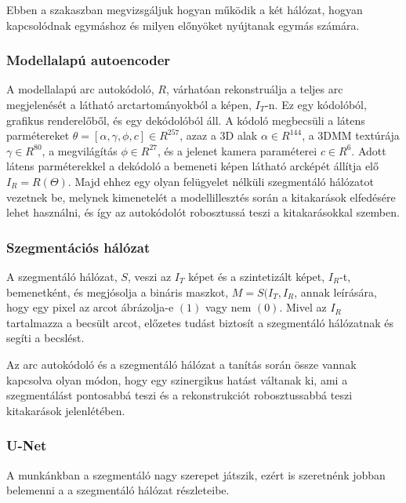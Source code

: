 \documentclass[12pt,a4]{article}
\begin{document}
            Ebben a szakaszban megvizsgáljuk hogyan működik a két hálózat,
     	      hogyan kapcsolódnak egymáshoz és milyen előnyöket nyújtanak
     	      egymás számára.

            \subsubsection{Modellalapú autoencoder}
        
                \cite{focus}A modellalapú arc autokódoló, $R$, várhatóan rekonstruálja a teljes arc
     	          megjelenését a látható arctartományokból a képen, $I_{T}$-n. 
                Ez egy kódolóból, grafikus renderelőből, és egy dekódolóból áll. A kódoló megbecsüli a látens parmétereket $\theta = [\alpha, \gamma, \phi, c] \in R^{257}$, azaz a 3D alak $\alpha \in R^{144}$, a 3DMM textúrája 
                $\gamma ∈ R^{80}$, a megvilágítás $\phi ∈ R^{27}$, és a jelenet kamera paraméterei $c ∈ R^{6}$. Adott látens parméterekkel a dekódoló a bemeneti képen látható arcképét állítja elő $I_{R} = R(\Theta)$. Majd ehhez egy olyan felügyelet nélküli szegmentáló hálózatot vezetnek be, melynek kimenetelét a modellillesztés során a kitakarások elfedésére lehet használni, és így az autokódolót robosztussá teszi a kitakarásokkal szemben.

            \subsubsection{Szegmentációs hálózat}
    
                \cite{focus}A szegmentáló hálózat, $S$, veszi az $I_{T}$ képet és a szintetizált képet, $I_{R}$-t, bemenetként, és megjósolja a bináris maszkot, $M = S(I_{T} , I_{R}$, annak leírására, hogy egy pixel az arcot ábrázolja-e $(1)$ vagy nem $(0)$. Mivel az $I_R$ tartalmazza a becsült arcot, előzetes tudást biztosít a szegmentáló hálózatnak és segíti a becslést.
     	
     	          Az arc autokódoló és a szegmentáló hálózat a tanítás során össze 
                vannak kapcsolva olyan módon, hogy egy szinergikus hatást váltanak ki, ami a szegmentálást pontosabbá teszi és a rekonstrukciót robosztussabbá teszi kitakarások jelenlétében.

            \subsubsection{U-Net}
    
                A munkánkban a szegmentáló nagy szerepet játszik, ezért is szeretnénk jobban belemenni a a szegmentáló hálózat részleteibe.
    
\end{document}
